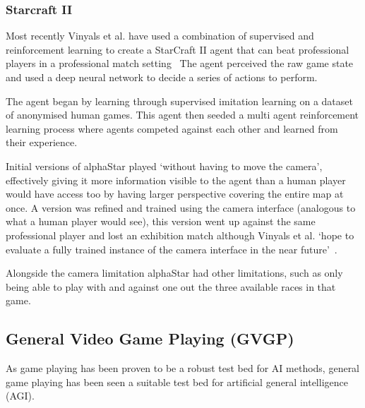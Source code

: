 \subsubsection{Starcraft II}
Most recently Vinyals et al. have used a combination of supervised and reinforcement learning to create a StarCraft II agent that can beat professional players in a professional match setting~\cite{alphastarblog}
The agent perceived the raw game state and used a deep neural network to decide a series of actions to perform.
\par
The agent began by learning through supervised imitation learning on a dataset of anonymised human games.
This agent then seeded a multi agent reinforcement learning process where agents competed against each other and learned from their experience.
\par
Initial versions of alphaStar played `without having to move the camera', effectively giving it more information visible to the agent than a human player would have access too by having larger perspective covering the entire map at once.
A version was refined and trained using the camera interface (analogous to what a human player would see), this version went up against the same professional player and lost an exhibition match although Vinyals et al. `hope to evaluate a fully trained instance of the camera interface in the near future'~\cite{alphastarblog}.
\par
Alongside the camera limitation alphaStar had other limitations, such as only being able to play with and against one out the three available races in that game.

\subsection{General Video Game Playing (GVGP)}
As game playing has been proven to be a robust test bed for AI methods, general game playing has been seen a suitable test bed for artificial general intelligence (AGI).
